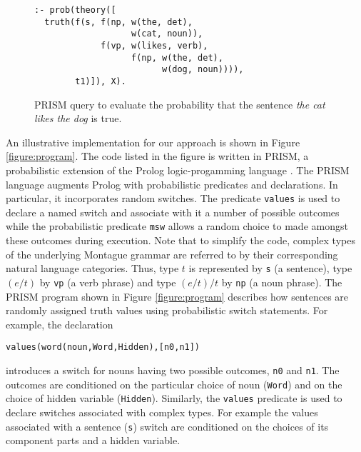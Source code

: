 \documentclass[11pt]{article}
\theoremstyle{definition}
\begin{document}
\begin{figure}
\begin{lstlisting}
:- prob(theory([
  truth(f(s, f(np, w(the, det),
                   w(cat, noun)),
             f(vp, w(likes, verb),
                   f(np, w(the, det),
                         w(dog, noun)))),
        t1)]), X).
\end{lstlisting}
\caption{PRISM query to evaluate the probability that the sentence
  \emph{the cat likes the dog} is true.}
\label{figure:query}
\end{figure}





An illustrative implementation for our approach is shown in Figure \ref{figure:program}. The code listed in the figure is written in PRISM, a probabilistic extension of the Prolog logic-progamming language \cite{Sato:97}. The PRISM language augments Prolog with probabilistic predicates and declarations. In particular, it incorporates random switches. The predicate \texttt{values} is used to declare a named switch and associate with it a number of possible outcomes while the probabilistic predicate \texttt{msw} allows a random choice to made amongst these outcomes during execution. Note that to simplify the code, complex types of the underlying Montague grammar are referred to by their corresponding natural language
categories. Thus, type $t$ is represented by \texttt{s} (a sentence), type $(e/t)$ by \texttt{vp} (a verb phrase) and type $(e/t)/t$ by \texttt{np} (a noun phrase). 
The PRISM program shown in Figure \ref{figure:program} describes how sentences are randomly assigned truth values using probabilistic switch statements. For example, the declaration
\vspace*{-0.8cm}
\begin{center}
{\small
\texttt{values(word(noun,Word,Hidden),[n0,n1])} 
}
\end{center}
introduces a switch for nouns having two possible outcomes, \texttt{n0} and \texttt{n1}.
The outcomes are conditioned on the particular choice of noun (\texttt{Word}) and on the choice of hidden variable (\texttt{Hidden}). Similarly, the \texttt{values} predicate is used to declare switches associated with complex types. For example the values associated with a sentence (\texttt{s}) switch are conditioned on the choices of its component parts and a hidden variable.
\end{document}
